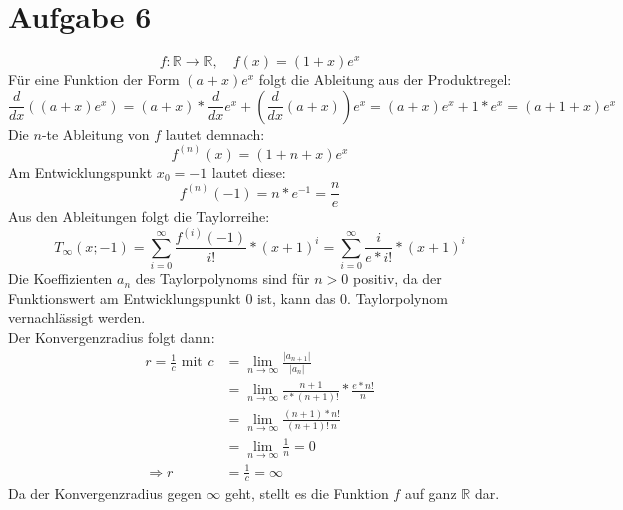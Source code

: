 \documentclass[a4paper]{article}
\begin{document}
\section*{Aufgabe 6}
\[
	f: \mathbb{R} \rightarrow \mathbb{R}, \quad
	f(x) = (1 + x) e^x
\]
Für eine Funktion der Form $(a+x) e^x$ folgt die Ableitung aus der Produktregel:
\[ 
	\frac{d}{dx} \left( (a+x)e^x \right) 
	= (a+x) * \frac{d}{dx} e^x + \left( \frac{d}{dx} (a+x) \right) e^x
	= (a+x) e^x + 1 * e^x 
	= (a+1+x) e^x
\]
Die $n$-te Ableitung von $f$ lautet demnach:
\[
	f^{(n)} (x) = (1+n+x) e^x
\]
Am Entwicklungspunkt $x_0 = -1$ lautet diese:
\[
	f^{(n)} (-1) = n * e^{-1} = \frac n e
\]
Aus den Ableitungen folgt die Taylorreihe:
\[
	T_\infty(x; -1) 
	= \sum_{i=0}^\infty \frac{f^{(i)}(-1)}{i!} * (x+1)^i
	= \sum_{i=0}^\infty \frac{i}{e * i!} * (x+1)^i
\]
Die Koeffizienten $a_n$ des Taylorpolynoms sind für $n > 0$ positiv, 
da der Funktionswert am Entwicklungspunkt 0 ist, kann das 0. Taylorpolynom
vernachlässigt werden.\\
Der Konvergenzradius folgt dann:
\begin{align*}
	r = \frac 1 c \text{ mit } 
	c &= \lim_{n\rightarrow\infty} \frac{\vert a_{n+1} \vert}{\vert a_n \vert} \\
	&= \lim_{n\rightarrow\infty} 
	\frac{n+1}{e * (n+1)!} * \frac{e * n!}{n} \\
	&= \lim_{n\rightarrow\infty}
	\frac{(n+1) * n!}{(n+1)! \ n} \\
	&= \lim_{n\rightarrow\infty}
	\frac1 n = 0 \\
	\Rightarrow
	r &= \frac{1}{c} = \infty
\end{align*}
Da der Konvergenzradius gegen $\infty$ geht, stellt es die Funktion $f$ 
auf ganz $\mathbb{R}$ dar.
\end{document}
